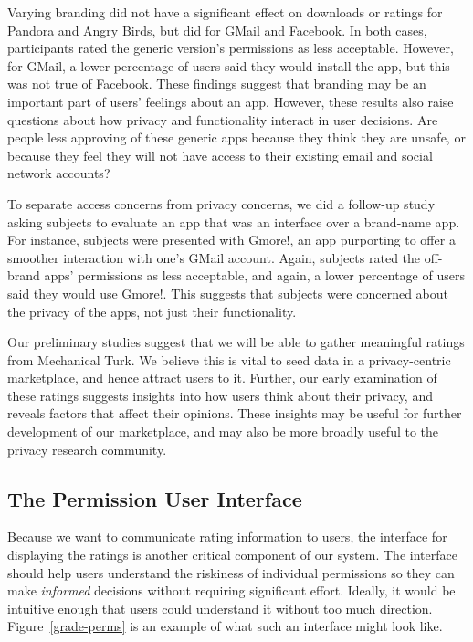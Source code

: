 \documentclass[11pt]{article}
\newcommand{\reffig}[1]{Figure~\ref{#1}}
\begin{document}
Varying branding did not have a significant effect on downloads or
ratings for Pandora and Angry Birds, but did 
for GMail and Facebook. In both cases,
participants rated the generic version's permissions as less
acceptable. However, for GMail, a lower percentage of users said they
would install the app, but this was not true of Facebook.  These
findings suggest that branding may be an important part of users'
feelings about an app. However, these results also raise questions
about how privacy and functionality interact in user decisions. Are
people less approving of these generic apps because they think they
are unsafe, or because they feel they will not have access to their
existing email and social network accounts?

To separate access concerns from privacy concerns, we did a follow-up
study asking subjects to evaluate an app that was an
interface over a brand-name app. For instance,
subjects were presented with Gmore!, an app purporting to offer a
smoother interaction with one's GMail account. Again, subjects rated
the off-brand apps' permissions as less acceptable, and again, a lower
percentage of users said they would use Gmore!. This suggests that
subjects were concerned about the privacy of the apps, not just their
functionality.

Our preliminary studies suggest that we will be able to gather
meaningful ratings from Mechanical Turk. We believe this is vital
to seed data in a privacy-centric marketplace, and hence attract users
to it. Further, our early examination of these ratings 
suggests insights into how users think about their privacy, and reveals
factors that affect their opinions. These insights may be useful for
further development of our marketplace, and may also be more broadly
useful to the privacy research community.

\subsection{The Permission User Interface}
\label{subsec-perm-ui}

Because we want to communicate rating information to users,
the interface for displaying the ratings is another critical component of 
our system. The interface should help users understand the 
riskiness of individual permissions so they can make \emph{informed}
decisions without requiring significant
effort. Ideally, it would be 
intuitive enough that users could understand it without too 
much direction. \reffig{grade-perms} is an example of what such an interface
might look like.
\end{document}

